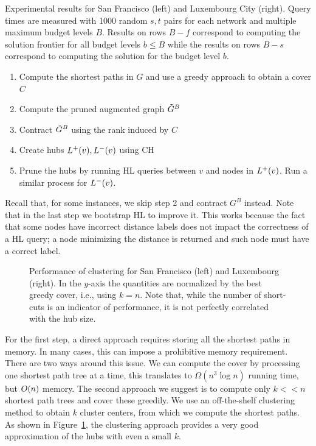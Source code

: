 \begin{table}
\caption{Experimental results for San Francisco (left) and Luxembourg City (right). Query times are measured with 1000 random $s,t$ pairs for each network and multiple maximum budget levels $B$. Results on rows $B-f$ correspond to computing the solution frontier for all budget levels $b\leq B$ while the results on rows $B-s$ correspond to computing the solution for the budget level $b$.}\label{tab:performance_results}
\end{table}


\begin{enumerate}[nosep]
\item Compute the shortest paths in $G$ and use a greedy approach to obtain a cover $C$
\item Compute the pruned augmented graph $\tilde G^B$
\item Contract $\tilde G^B$ using the rank induced by $C$
\item Create hubs $L^+(v),L^-(v)$ using CH
\item Prune the hubs by running HL queries between $v$ and nodes in $L^+(v)$. 
Run a similar process for $L^-(v)$.
\end{enumerate}
Recall that, for some instances, we skip step 2 and contract $G^B$ instead.
Note that in the last step we bootstrap HL to improve it.
This works because the fact that some nodes have incorrect distance labels does not impact the correctness of a HL query; a node minimizing the distance is returned and such node must have a correct label.

\begin{figure}
\begin{minipage}{0.5\textwidth}
\centering

\end{minipage}%
\begin{minipage}{0.5\textwidth}
\centering

\end{minipage}
\caption{Performance of clustering for San Francisco (left) and Luxembourg (right). 
In the $y$-axis the quantities are normalized by the best greedy cover, i.e., using $k=n$.
Note that, while the number of short-cuts is an indicator of performance, it is not perfectly correlated with the hub size.}
\label{fig:clusters}
\end{figure}

\vspace{-0.5em}
\begin{remark}
For the first step, a direct approach requires storing all the shortest paths in memory.
In many cases, this can impose a prohibitive memory requirement.
There are two ways around this issue.
We can compute the cover by processing one shortest path tree at a time, this translates to $\Omega(n^3\log n)$ running time, but $O(n)$ memory.
The second approach we suggest is to compute only $k<<n$ shortest path trees and cover these greedily.
We use an off-the-shelf clustering method to obtain $k$ cluster centers, from which we compute the shortest paths. 
As shown in Figure~\ref{fig:clusters}, the clustering approach provides a very good approximation of the hubs with even a small $k$.
\end{remark}

